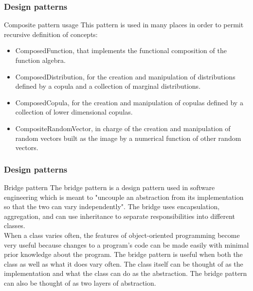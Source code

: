 \documentclass[8pt]{beamer}
\begin{document}
\begin{frame}
  \frametitle{Design patterns}
  \begin{block}{Composite pattern usage}
    This pattern is used in many places in order to permit recursive definition of concepts:
    \begin{itemize}
    \item \alert{ComposedFunction}, that implements the functional composition of the function algebra.
    \item \alert{ComposedDistribution}, for the creation and manipulation of distributions defined by a copula and a collection of marginal distributions.
    \item \alert{ComposedCopula}, for the creation and manipulation of copulas defined by a collection of lower dimensional copulas.
    \item \alert{CompositeRandomVector}, in charge of the creation and manipulation of random vectors built as the image by a numerical function of other random vectors.
    \end{itemize}
  \end{block}
\end{frame}
\begin{frame}
  \frametitle{Design patterns}
  \begin{block}{Bridge pattern}
    The \alert{bridge pattern} is a design pattern used in software engineering which is meant to "uncouple an abstraction from its implementation so that the two can vary independently". The bridge uses encapsulation, aggregation, and can use inheritance to separate responsibilities into different classes.\\
    When a class varies often, the features of object-oriented programming become very useful because changes to a program's code can be made easily with minimal prior knowledge about the program. The bridge pattern is useful when both the class as well as what it does vary often. The class itself can be thought of as the implementation and what the class can do as the abstraction. The bridge pattern can also be thought of as two layers of abstraction.
  \end{block}
\end{frame}
\end{document}

